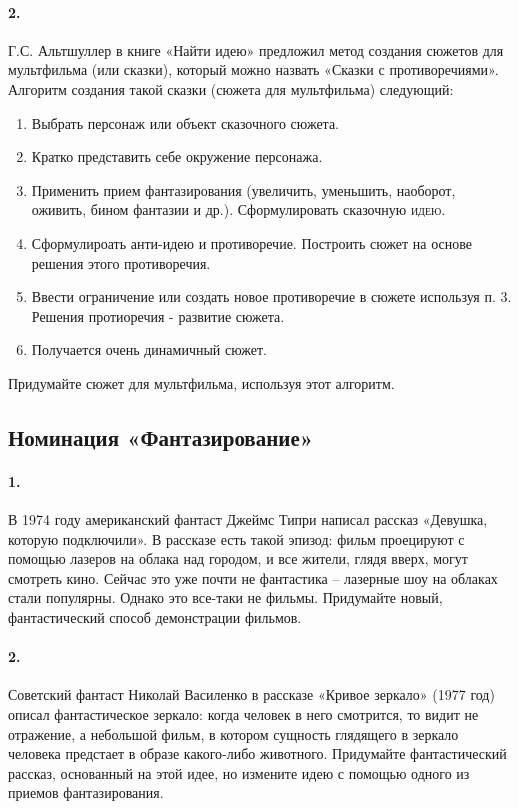 \documentclass[11pt,a4paper]{article}
\begin{document}
\paragraph{2.}
Г.С. Альтшуллер в книге «Найти идею» предложил метод создания сюжетов для
мультфильма (или сказки), который можно назвать «Сказки с противоречиями».
Алгоритм создания такой сказки (сюжета для мультфильма) следующий:

\begin{enumerate}
\item Выбрать персонаж или объект сказочного сюжета.
\item Кратко представить себе окружение персонажа.
\item Применить прием фантазирования (увеличить, уменьшить, наоборот, оживить,
  бином фантазии и др.). Сформулировать сказочную \textsc{идею}.
\item Сформулироать анти-идею и противоречие. Построить сюжет на основе
  решения этого противоречия.
\item Ввести ограничение или создать новое противоречие в сюжете используя
  п. 3. Решения протиоречия - развитие сюжета.
\item Получается очень динамичный сюжет.
\end{enumerate}

Придумайте сюжет для мультфильма, используя этот алгоритм.

\subsection*{Номинация «Фантазирование»}

\paragraph{1.}
В 1974 году американский фантаст Джеймс Типри написал рассказ «Девушка,
которую подключили». В рассказе есть такой эпизод: фильм проецируют с помощью
лазеров на облака над городом, и все жители, глядя вверх, могут смотреть
кино. Сейчас это уже почти не фантастика – лазерные шоу на облаках стали
популярны. Однако это все-таки не фильмы. Придумайте новый, фантастический
способ демонстрации фильмов.

\paragraph{2.}
Советский фантаст Николай Василенко в рассказе «Кривое зеркало» (1977 год)
описал фантастическое зеркало: когда человек в него смотрится, то видит не
отражение, а небольшой фильм, в котором сущность глядящего в зеркало человека
предстает в образе какого-либо животного. Придумайте фантастический рассказ,
основанный на этой идее, но измените идею с помощью одного из приемов
фантазирования.
\end{document}
